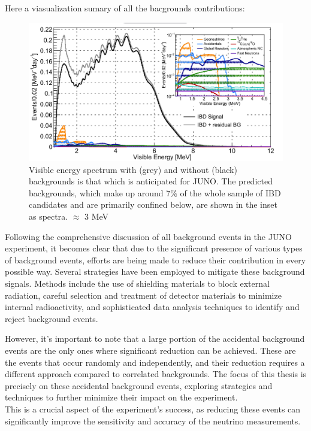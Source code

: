 Here a viasualization sumary of all the bacgrounds contributions:

\begin{figure}[h]
	\centering
	\includegraphics[width=0.7\linewidth]{Images/backgrounds_spectrum}
	\caption{Visible energy spectrum with (grey) and without (black) backgrounds is that which is anticipated for JUNO. The predicted backgrounds, which make up around 7$\%$ of the whole sample of IBD candidates and are primarily confined below, are shown in the inset as spectra. $\approx$ 3 MeV}
	\label{fig:backgroundsspectrum}
\end{figure}


Following the comprehensive discussion of all background events in the JUNO experiment, it becomes clear that due to the significant presence of various types of background events, efforts are being made to reduce their contribution in every possible way. Several strategies have been employed to mitigate these background signals. Methods include the use of shielding materials to block external radiation, careful selection and treatment of detector materials to minimize internal radioactivity, and sophisticated data analysis techniques to identify and reject background events.

However, it's important to note that a large portion of the accidental background events are the only ones where significant reduction can be achieved. These are the events that occur randomly and independently, and their reduction requires a different approach compared to correlated backgrounds. The focus of this thesis is precisely on these accidental background events, exploring strategies and techniques to further minimize their impact on the experiment.\\
This is a crucial aspect of the experiment's success, as reducing these events can significantly improve the sensitivity and accuracy of the neutrino measurements.	 
